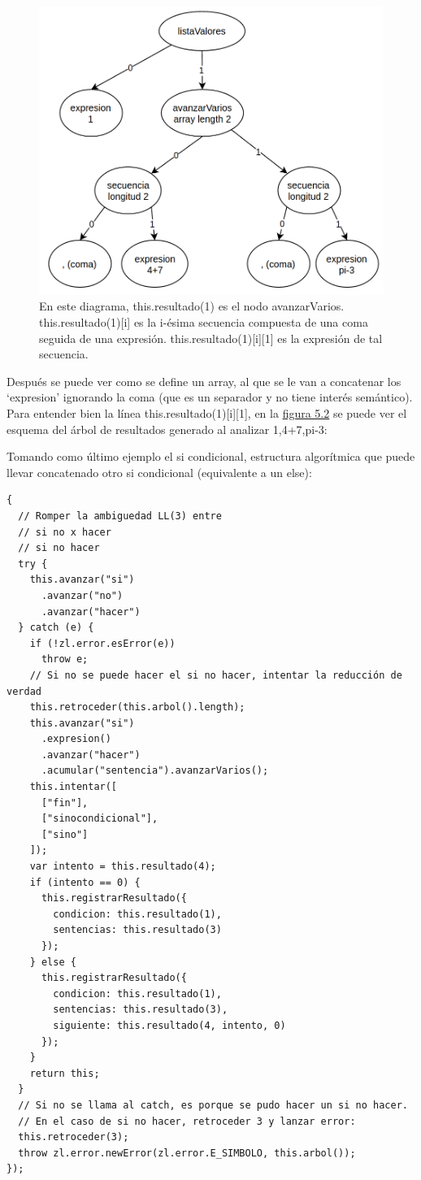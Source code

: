 \documentclass{report}
\begin{document}
	\vspace{10px}

\begin{figure}
	\centering
	\includegraphics[width=0.5\linewidth]{analisisejemplo}
	\caption[Ejemplo de análisis.]{En este diagrama, this.resultado(1) es el nodo avanzarVarios. this.resultado(1)[i] es la i-ésima secuencia compuesta de una coma seguida de una expresión. this.resultado(1)[i][1] es la expresión de tal secuencia.}
	\label{fig:analisisejemplo}
\end{figure}


	Después se puede ver como se define un array, al que se le van a concatenar los `expresion' ignorando la coma (que es un separador y no tiene interés semántico). Para entender bien la línea this.resultado(1)[i][1], en la \hyperref[fig:analisisejemplo]{figura 5.2} se puede ver el esquema del árbol de resultados generado al analizar 1,4+7,pi-3:

	\vspace{10px}

	Tomando como último ejemplo el si condicional, estructura algorítmica que puede llevar concatenado otro si condicional (equivalente a un else):
	
	
\begin{BVerbatim}
{
  // Romper la ambiguedad LL(3) entre
  // si no x hacer
  // si no hacer
  try {
    this.avanzar("si")
      .avanzar("no")
      .avanzar("hacer")
  } catch (e) {
    if (!zl.error.esError(e))
      throw e;
    // Si no se puede hacer el si no hacer, intentar la reducción de verdad
    this.retroceder(this.arbol().length);
    this.avanzar("si")
      .expresion()
      .avanzar("hacer")
      .acumular("sentencia").avanzarVarios();
    this.intentar([
      ["fin"],
      ["sinocondicional"],
      ["sino"]
    ]);
    var intento = this.resultado(4);
    if (intento == 0) {
      this.registrarResultado({
        condicion: this.resultado(1),
        sentencias: this.resultado(3)
      });
    } else {
      this.registrarResultado({
        condicion: this.resultado(1),
        sentencias: this.resultado(3),
        siguiente: this.resultado(4, intento, 0)
      });
    }
    return this;
  }
  // Si no se llama al catch, es porque se pudo hacer un si no hacer.
  // En el caso de si no hacer, retroceder 3 y lanzar error:
  this.retroceder(3);
  throw zl.error.newError(zl.error.E_SIMBOLO, this.arbol());
});
\end{BVerbatim}
	
\end{document}
